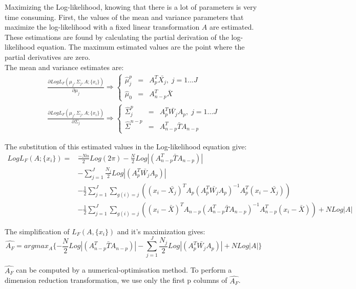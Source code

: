 Maximizing the Log-likelihood, knowing that there is a lot of parameters is very time consuming.
First, the values of the mean and variance parameters that maximize the log-likelihood with a fixed linear transformation $A$ are estimated.
These estimations are found by calculating the partial derivation of the log-likelihood equation. The maximum estimated values are the point where the partial derivatives are zero. \\
The mean and variance estimates are:
$$
\begin{array}{cc}
  \frac{\partial Log L_F(\mu_j, \Sigma_j, A; \{x_i\})}{\partial \mu_j} \Rightarrow \left \{
  \begin{array}{ccc}
    \hat\mu_j^p & = & A_p^T\bar{X_j} ,\; j = 1...J\\
    \hat\mu_0 & = & A_{n - p}^T\bar{X}
  \end{array}
  \right . \\
  \frac{\partial Log L_F(\mu_j, \Sigma_j, A; \{x_i\})}{\partial \Sigma_j} \Rightarrow \left \{
  \begin{array}{ccc}
    \hat\Sigma_j^p & = & A_p^T\bar{W_j}A_p, \; j = 1...J\\
    \hat\Sigma^{n - p} & = & A_{n - p}^T\bar{T}A_{n - p}
  \end{array}
  \right .
\end{array}$$

The substitution of this estimated values in the Log-likelihood equation give:
$$
\begin{array}{cl}
  Log L_F(A; \{x_i\}) = & \frac{-N n}{2}Log(2\pi)-\frac{N}{2}Log|(A_{n - p}^T\bar{T}A_{n - p})| \\
  & - \sum\limits_{j = 1}^J
  \frac{N_j}{2}Log|(A_p^T\bar{W_j}A_p)| \\
  & - \frac{1}{2}\sum\limits_{j = 1}^J\sum\limits_{g(i) = j} ((x_i - \bar{X_j})^TA_p(A_p^T\bar{W_j}A_p)^{-1}
  A_p^T(x_i - \bar{X_j})) \\
  & - \frac{1}{2}\sum\limits_{j = 1}^J\sum\limits_{g(i) = j} ((x_i - \bar{X})^TA_{n - p}(A_{n - p}^T\bar{T}A_{n - p})^{-1}
  A_{n - p}^T(x_i - \bar{X})) + N Log|A|
  \end{array}$$

The simplification of $L_F(A, \{x_i\})$ and it's maximization gives:
$$ \hat{A_F} = argmax_A\{-\frac{N}{2}Log|(A_{n - p}^T\bar{T}A_{n - p})| - \sum\limits_{j = 1}^J\frac{N_j}{2}Log|(A_p^T\bar{W_j}A_p)|
+ N Log|A|\}$$

$\hat{A_F}$ can be computed by a numerical-optimisation method.
To perform a dimension reduction transformation, we use only the first p columns of $\hat{A_F}$.

